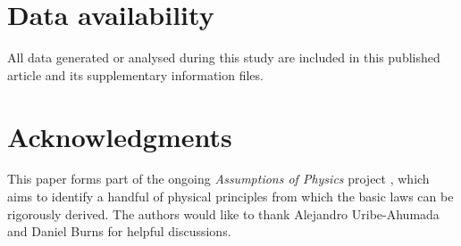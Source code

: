 \documentclass[fleqn,10pt]{wlscirep}
\begin{document}
\vspace{-1mm}
\section*{Data availability}
All data generated or analysed during this study are included in this published article and its supplementary information files.

\vspace{-1mm}
\section*{Acknowledgments}
This paper forms part of the ongoing \textit{Assumptions of Physics} project \cite{aop-book}, which aims to identify a handful of physical principles from which
the basic laws can be rigorously derived. The authors would like to thank Alejandro Uribe-Ahumada and Daniel Burns for helpful discussions. 


\end{document}
